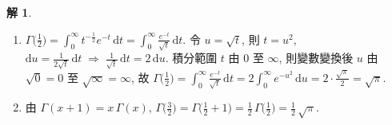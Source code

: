 \documentclass[12pt]{extarticle}
\newcommand{\ds}{\displaystyle}
\newcommand{\ie}{\;\Longrightarrow\;}
\theoremstyle{definition}
\newtheorem*{sol}{解}
\begin{document}
\begin{sol}
\begin{enumerate}
      \begin{enumerate}\setlength{\itemsep}{0pt}
        \item $\ds\Gamma\Big(\frac{1}{2}\Big)=\int_{0}^{\infty} t^{-\frac{1}{2}} e^{-t}\,\text{d}t = \int_{0}^{\infty}\frac{e^{-t}}{\sqrt{t}}\,\text{d}t$. 令 $\ds u = \sqrt{t}$, 則 $\ds t = u^2$, $\ds\text{d}u = \frac{1}{2\sqrt{t}}\,\text{d}t \ie \frac{1}{\sqrt{t}}\,\text{d}t = 2\,\text{d}u$. 積分範圍 $t$ 由 $0$ 至 $\infty$, 則變數變換後 $u$ 由 $\ds\sqrt{0} = 0$ 至 $\ds\sqrt{\infty} = \infty$, 故 $\ds\Gamma\Big(\frac{1}{2}\Big) = \int_{0}^{\infty}\!\frac{e^{-t}}{\sqrt{t}}\,\text{d}t = 2\int_0^\infty\!\!e^{-u^2}\,\text{d}u = 2\cdot\frac{\sqrt{\pi}}{2} = \sqrt{\pi}$. 
        \item 由 $\ds\Gamma(x + 1) = x\,\Gamma(x)$, $\ds\Gamma\Big(\frac{3}{2}\Big) = \Gamma\Big(\frac{1}{2} + 1\Big) = \frac{1}{2}\,\Gamma\Big(\frac{1}{2}\Big) = \frac{1}{2}\,\sqrt{\pi}$. 
      \end{enumerate}
  \end{enumerate}
\end{sol}
\end{document}

